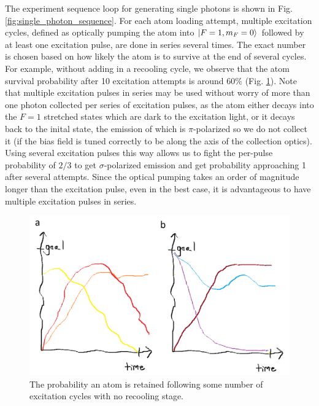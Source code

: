 The experiment sequence loop for generating single photons is shown in Fig. \ref{fig:single_photon_sequence}. For each atom loading attempt, multiple excitation cycles, defined as optically pumping the atom into $\ket{F=1,m_F=0}$ followed by at least one excitation pulse, are done in series several times. The exact number is chosen based on how likely the atom is to survive at the end of several cycles. For example, without adding in a recooling cycle, we observe that the atom survival probability after 10 excitation attempts is around 60$\%$ (Fig. \ref{fig:sequence_survival_probability}). Note that multiple excitation pulses in series may be used without worry of more than one photon collected per series of excitation pulses, as the atom either decays into the $F=1$ stretched states which are dark to the excitation light, or it decays back to the inital state, the emission of which is $\pi$-polarized so we do not collect it (if the bias field is tuned correctly to be along the axis of the collection optics). Using several excitation pulses this way allows us to fight the per-pulse probability of $2/3$ to get $\sigma$-polarized emission and get probability approaching 1 after several attempts. Since the optical pumping takes an order of magnitude longer than the excitation pulse, even in the best case, it is advantageous to have multiple excitation pulses in series. 

\begin{figure}[!h]
    \centering
    \includegraphics[width=\textwidth]{Images/fig_coming_soon.png}
    \caption{The probability an atom is retained following some number of excitation cycles with no recooling stage.}
    \label{fig:sequence_survival_probability}
\end{figure}




